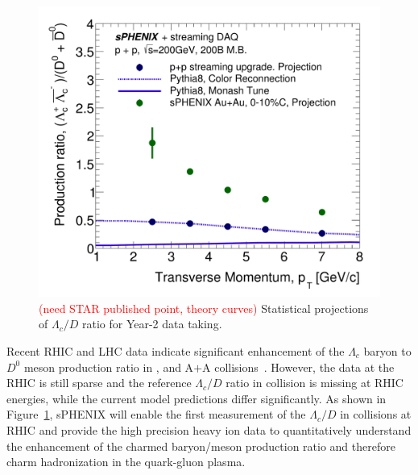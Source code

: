 



\begin{figure}[htbp]
\begin{center}
\includegraphics[width=.6\linewidth]{figs/RAA_DB_theory_root_LcD0Ratio_pp200B.pdf}
\caption{{\textcolor{red}{(need STAR published point, theory curves)}} Statistical projections of $\Lambda_c/D$ ratio for Year-2 data taking.}
\label{fig:Lc-D0}
\end{center}
\end{figure}


Recent RHIC and LHC data indicate significant enhancement of the
$\Lambda_c$ baryon to $D^0$ meson production ratio in \pp, \pA and A$+$A
collisions~\cite{Adam:2019hpq}. However, the data at the RHIC is still
sparse and the reference $\Lambda_c/D$ ratio in \pp collision is
missing at RHIC energies, while the current model predictions
differ significantly. As shown in Figure~\ref{fig:Lc-D0}, sPHENIX will
enable the first measurement of the $\Lambda_c/D$ in \pp collisions at
RHIC and provide the high precision heavy ion data to quantitatively
understand the enhancement of the charmed baryon/meson production
ratio and therefore charm hadronization in the quark-gluon plasma.

